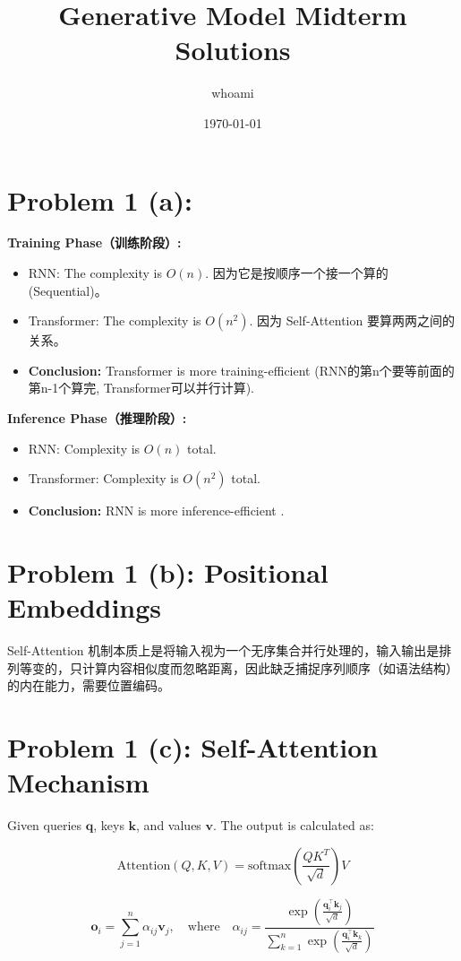 \documentclass[12pt]{article}
\title{Generative Model Midterm Solutions}
\author{whoami}
\date{\today}
\begin{document}
\maketitle

\section*{Problem 1 (a): }

\textbf{Training Phase（训练阶段）:}
\begin{itemize}
    \item RNN: The complexity is $O(n)$. 因为它是按顺序一个接一个算的 (Sequential)。
    \item Transformer: The complexity is $O(n^2)$. 因为 Self-Attention 要算两两之间的关系。
    \item \textbf{Conclusion:} Transformer is more training-efficient (RNN的第n个要等前面的第n-1个算完, Transformer可以并行计算).
\end{itemize}

\textbf{Inference Phase（推理阶段）:}
\begin{itemize}
    \item RNN: Complexity is $O(n)$ total.
    \item Transformer: Complexity is $O(n^2)$ total.
    \item \textbf{Conclusion:} RNN is more inference-efficient .
\end{itemize}


\section*{Problem 1 (b): Positional Embeddings}

Self-Attention 机制本质上是将输入视为一个无序集合并行处理的，输入输出是排列等变的，只计算内容相似度而忽略距离，因此缺乏捕捉序列顺序（如语法结构）的内在能力，需要位置编码。


\section*{Problem 1 (c): Self-Attention Mechanism}

Given queries $\mathbf{q}$, keys $\mathbf{k}$, and values $\mathbf{v}$. The output is calculated as:

\[
    \text{Attention}(Q, K, V) = \text{softmax}\left( \frac{QK^T}{\sqrt{d}} \right) V
\]

\[
\mathbf{o}_i = \sum_{j=1}^n \alpha_{ij} \mathbf{v}_j, \quad \text{where} \quad 
\alpha_{ij} = \frac{\exp\left( \frac{\mathbf{q}_i^\top \mathbf{k}_j}{\sqrt{d}} \right)}{\sum_{k=1}^n \exp\left( \frac{\mathbf{q}_i^\top \mathbf{k}_k}{\sqrt{d}} \right)}
\]
\end{document}
